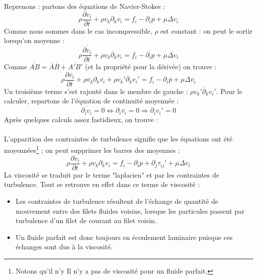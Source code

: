 	Reprenons : partons des équations de Navier-Stokes :
	\begin{equation}
	\rho \frac{\partial v_i}{\partial t} + \rho v_k\partial_kv_i = f_i - \partial_ip + \mu \Delta
	v_i
	\end{equation}
	Comme nous sommes dans le cas incompressible, $\rho$ est constant : on peut le sortir lorsqu'on 
	moyenne :
	\begin{equation}
	\rho \frac{\overline{\partial v_i}}{\partial t} + \rho \overline{v_k\partial_kv_i} = f_i - 
	\overline{\partial_ip} + \mu \overline{\Delta v_i}
	\end{equation}
	Comme $\overline{AB} = \overline{A}\overline{B} + 	\overline{A'B'}$ (et la propriété pour la 
	dérivée) on trouve :
	\begin{equation}
	\rho \frac{\partial \overline{v_i}}{\partial t} + \rho \overline{v_k}\partial_k\overline{v_i} +
	\rho\overline{v_k'\partial_k v_i'} = f_i - \partial_i\overline{p} + \mu \Delta\overline{v_i}
	\end{equation}
	Un troisième terme s'est rajouté dans le membre de gauche : $\rho\overline{v_k'\partial_k v_i'}$.
	Pour le calculer, repartons de l'équation de continuité moyennée :
	\begin{equation}
	\overline{\partial_iv_i} = 0 \Leftrightarrow \partial_i\overline{v_i} = 0 \Rightarrow \partial_i
	v_i'=0
	\end{equation}
	Après quelques calculs assez fastidieux, on trouve :\\
	
	\ \\
	L'apparition des contraintes de turbulence signifie que les équations ont été moyennées\footnote{
	Notons qu'il n'y Il n'y a pas de viscosité pour un fluide parfait.} ; on peut supprimer les barres 
	des moyennes :
	\begin{equation}
	\rho \frac{\partial v_i}{\partial t} + \rho v_k\partial_k v_i = f_i - \partial_i p + \partial_j
	\tau_{ij}' +\mu \Delta v_i
	\end{equation}
	La viscosité se traduit par le terme "laplacien" et par les contraintes de turbulence. Tout se
	retrouve en effet dans ce terme de viscosité :
	\begin{itemize}
	\item Les contraintes de turbulence résultent de l'échange de quantité de mouvement entre des 
	filets fluides voisins, lorsque les particules passent par turbulence d'un filet de courant au 
	filet voisin.
	\item Un fluide parfait est donc toujours en écoulement laminaire puisque ces échanges sont dus 
	à la viscosité.
	\end{itemize}
	
